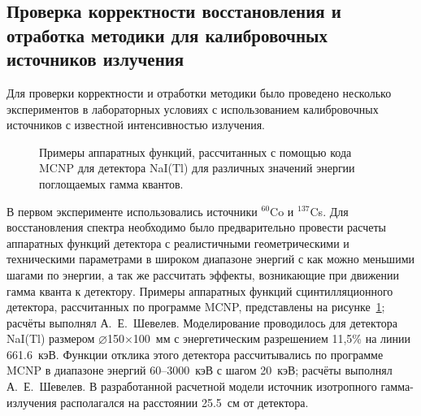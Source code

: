 
\subsection{ Проверка корректности восстановления и отработка методики для калибровочных источников излучения }

Для проверки корректности и отработки методики было проведено несколько экспериментов в лабораторных условиях с использованием калибровочных источников с известной интенсивностью излучения.


\begin{figure}[ht!]
  \caption{ Примеры аппаратных функций, рассчитанных с помощью кода MCNP для детектора NaI(Tl) для различных значений энергии поглощаемых гамма квантов.~\cite{Shevelev2013} }
  \label{fig:mcnpInstFunctionsNaI}
\end{figure}

В первом эксперименте использовались источники ${}^{60}$Co и ${}^{137}$Cs. Для восстановления спектра необходимо было предварительно провести расчеты аппаратных функций детектора с реалистичными геометрическими и техническими параметрами в широком диапазоне энергий с как можно меньшими шагами по энергии, а так же рассчитать эффекты, возникающие при движении гамма кванта к детектору. Примеры аппаратных функций сцинтилляционного детектора, рассчитанных по программе MCNP, представлены на рисунке~\ref{fig:mcnpInstFunctionsNaI}; расчёты выполнял А.~Е.~Шевелев. Моделирование проводилось для детектора NaI(Tl) размером $\varnothing$150$\times$100~мм с энергетическим разрешением 11,5\% на линии 661.6~кэВ. Функции отклика этого детектора рассчитывались по программе MCNP в диапазоне энергий 60--3000~кэВ с шагом 20~кэВ; расчёты выполнял А.~Е.~Шевелев. В разработанной расчетной модели источник изотропного гамма-излучения располагался на расстоянии 25.5~см от детектора. 


